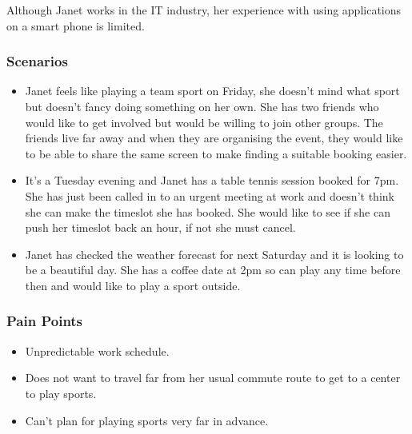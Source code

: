Although Janet works in the IT industry, her experience with using
applications on a smart phone is limited.


\subsubsection*{Scenarios}
\label{ssub:working_scenarios}

\begin{itemize}
	\item Janet feels like playing a team sport on Friday, she doesn't mind
		what sport but doesn't fancy doing something on her own. She has two
		friends who would like to get involved but would be willing to join
		other groups. The friends live far away and when they are organising
		the event, they would like to be able to share the same screen to make
		finding a suitable booking easier.

	\item It's a Tuesday evening and Janet has a table tennis session booked
		for 7pm. She has just been called in to an urgent meeting at work and
		doesn't think she can make the timeslot she has booked. She would like
		to see if she can push her timeslot back an hour, if not she must
		cancel.

	\item Janet has checked the weather forecast for next Saturday and it is
		looking to be a beautiful day. She has a coffee date at 2pm so can play
		any time before then and would like to play a sport outside.
\end{itemize}


\subsubsection*{Pain Points}
\label{ssub:working_pain_points}

\begin{itemize}
	\item Unpredictable work schedule.
	\item Does not want to travel far from her usual commute route to get to a
		center to play sports.
	\item Can't plan for playing sports very far in advance.
\end{itemize}

